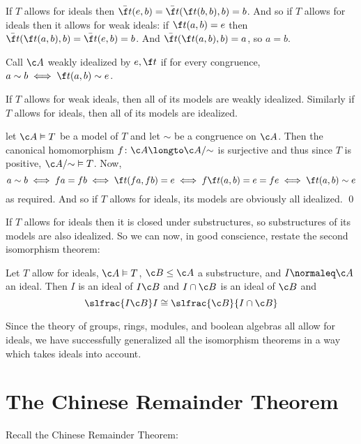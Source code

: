 \edefn

If $T$ allows for ideals then $\bar{\f t}(e,b)=\bar{\f t}(\f t(b,b),b)=b$.
And so if $T$ allows for ideals then it allows for weak ideals: if $\f t(a,b) = e$ then $\bar{\f t}(\f t(a,b),b) = \bar{\f t}(e,b) = b$.
And $\bar{\f t}(\f t(a,b),b)=a$, so $a=b$.

\bdefn

    Call $\c A$ {\emphcolor weakly idealized} by $e,\f t$ if for every congruence, $a\sim b\iff\f t(a,b)\sim e$.

\edefn

\bthrm

    If $T$ allows for weak ideals, then all of its models are weakly idealized.
    Similarly if $T$ allows for ideals, then all of its models are idealized.

\ethrm

\Proof let $\c A\vDash T$ be a model of $T$ and let $\sim$ be a congruence on $\c A$.
Then the canonical homomorphism $f\colon\c A\longto\c A/{\sim}$ is surjective and thus since $T$ is positive, $\c A/{\sim}\vDash T$.
Now,
$$ a\sim b \iff fa = fb \iff \f t(fa,fb) = e \iff f\f t(a,b) = e = fe \iff \f t(a,b) \sim e $$
as required.
And so if $T$ allows for ideals, its models are obviously all idealized.
\qed

If $T$ allows for ideals then it is closed under substructures, so substructures of its models are also idealized.
So we can now, in good conscience, restate the second isomorphism theorem:

\bthrm[title=The Idealized Second Isomorphism Theorem]

    Let $T$ allow for ideals, $\c A\vDash T$, $\c B\leq\c A$ a substructure, and $I\normaleq\c A$ an ideal.
    Then $I$ is an ideal of $I\c B$ and $I\cap\c B$ is an ideal of $\c B$ and
    $$ \slfrac{I\c B}I \cong \slfrac{\c B}{I\cap\c B} $$

\ethrm

Since the theory of groups, rings, modules, and boolean algebras all allow for ideals, we have successfully generalized all the isomorphism theorems in a way which takes ideals into account.

\section{The Chinese Remainder Theorem}

Recall the Chinese Remainder Theorem:

\bthrm[title=Chinese Remainder Theorem]

